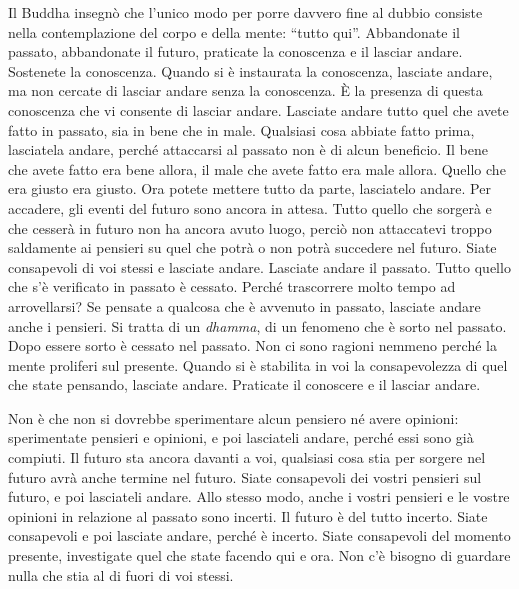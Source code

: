 Il Buddha insegnò che l'unico modo per porre davvero fine al dubbio
consiste nella contemplazione del corpo e della mente: ``tutto qui''.
Abbandonate il passato, abbandonate il futuro, praticate la conoscenza e
il lasciar andare. Sostenete la conoscenza. Quando si è instaurata la
conoscenza, lasciate andare, ma non cercate di lasciar andare senza la
conoscenza. È la presenza di questa conoscenza che vi consente di
lasciar andare. Lasciate andare tutto quel che avete fatto in passato,
sia in bene che in male. Qualsiasi cosa abbiate fatto prima, lasciatela
andare, perché attaccarsi al passato non è di alcun beneficio. Il bene
che avete fatto era bene allora, il male che avete fatto era male
allora. Quello che era giusto era giusto. Ora potete mettere tutto da
parte, lasciatelo andare. Per accadere, gli eventi del futuro sono
ancora in attesa. Tutto quello che sorgerà e che cesserà in futuro non
ha ancora avuto luogo, perciò non attaccatevi troppo saldamente ai
pensieri su quel che potrà o non potrà succedere nel futuro. Siate
consapevoli di voi stessi e lasciate andare. Lasciate andare il passato.
Tutto quello che s'è verificato in passato è cessato. Perché trascorrere
molto tempo ad arrovellarsi? Se pensate a qualcosa che è avvenuto in
passato, lasciate andare anche i pensieri. Si tratta di un
\emph{dhamma}, di un fenomeno che è sorto nel passato. Dopo essere sorto
è cessato nel passato. Non ci sono ragioni nemmeno perché la mente
proliferi sul presente. Quando si è stabilita in voi la consapevolezza
di quel che state pensando, lasciate andare. Praticate il conoscere e il
lasciar andare.

Non è che non si dovrebbe sperimentare alcun pensiero né avere opinioni:
sperimentate pensieri e opinioni, e poi lasciateli andare, perché essi
sono già compiuti. Il futuro sta ancora davanti a voi, qualsiasi cosa
stia per sorgere nel futuro avrà anche termine nel futuro. Siate
consapevoli dei vostri pensieri sul futuro, e poi lasciateli andare.
Allo stesso modo, anche i vostri pensieri e le vostre opinioni in
relazione al passato sono incerti. Il futuro è del tutto incerto. Siate
consapevoli e poi lasciate andare, perché è incerto. Siate consapevoli
del momento presente, investigate quel che state facendo qui e ora. Non
c'è bisogno di guardare nulla che stia al di fuori di voi stessi.

